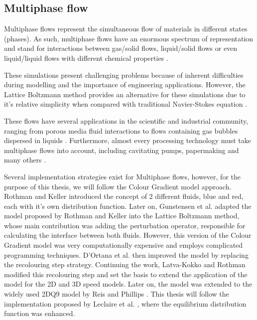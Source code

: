 \documentclass[12pt, openany]{book}
\begin{document}
\subsection{Multiphase flow}
Multiphase flows represent the simultaneous flow of materials in different states (phases). As such, multiphase flows have an enormous spectrum of representation and stand for interactions between gas/solid flows, liquid/solid flows or even liquid/liquid flows with different chemical properties \cite{multiphase}.\par
These simulations present challenging problems because of inherent difficulties during modelling and the importance of engineering applications. However, the Lattice Boltzmann method provides an alternative for these simulations due to it's relative simplicity when compared with traditional Navier-Stokes equation \cite{chenDoolenMP}.
\par These flows have several applications in the scientific and industrial community, ranging from porous media fluid interactions \cite{pourous} to flows containing gas bubbles dispersed in liquids \cite{gasBubble}. Furthermore, almost every processing technology must take multiphase flows into account, including cavitating pumps, papermaking and many others \cite{multiphase}.
\par Several implementation strategies exist for Multiphase flows, however, for the purpose of this thesis, we will follow the Colour Gradient model approach. Rothman and Keller \cite{rk} introduced the concept of 2 different fluids, blue and red, each with it's own distribution function. Later on, Gunstensen et al.  \cite{gunstensen} adapted the model proposed by Rothman and Keller into the Lattice Boltzmann method, whose main contribution was adding the perturbation operator, responsible for calculating the interface between both fluids. However, this version of the Colour Gradient model was very computationally expensive and employs complicated programming techniques. D'Ortana et al. \cite{dortana} then improved the model by replacing the recolouring step strategy. Continuing the work, Latva-Kokko and Rothman modified this recolouring step and set the basis to extend the application of the model for the 2D and 3D speed models. Later on, the model was extended to the widely used 2DQ9 model by Reis and Phillips \cite{reisPhil}. This thesis will follow the implementation proposed by Leclaire et al. \cite{leclaire1, leclaire2, leclaire3}, where the equilibrium distribution function was enhanced.
\end{document}
